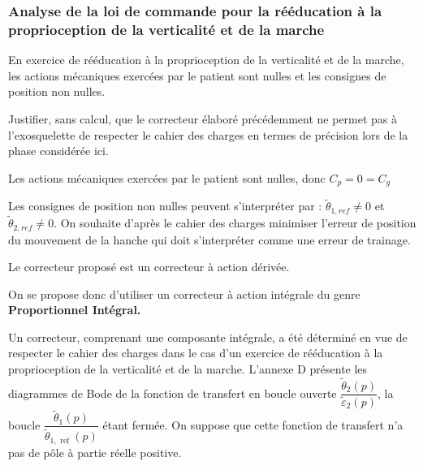 \subsubsection{Analyse de la loi de commande pour la rééducation à la proprioception de la verticalité et de la marche}

En exercice de rééducation à la proprioception de la verticalité et de la marche, les actions mécaniques exercées par le patient sont nulles et les consignes de position non nulles.\\

\begin{question}
\label{2023_ccs_psi_q_30}
Justifier, sans calcul, que le correcteur élaboré précédemment ne permet pas à l'exosquelette de respecter le cahier des charges en termes de précision lors de la phase considérée ici.
\end{question}
\ifprof
\begin{corrige}
Les actions mécaniques exercées par le patient sont nulles, donc $C_p=0=C_g$

Les consignes de position non nulles peuvent s'interpréter par : $\tilde{\theta}_{1,ref}\neq 0$ et $\tilde{\theta}_{2,ref}\neq 0$.
On souhaite d'après le cahier des charges minimiser l'erreur de position du mouvement de la hanche qui doit s'interpréter comme une erreur de trainage.

Le correcteur proposé est un correcteur à action dérivée.

On se propose donc d'utiliser un correcteur à action intégrale du genre \textbf{Proportionnel Intégral.}

\end{corrige}
\else
\fi

\ifprof
\else
Un correcteur, comprenant une composante intégrale, a été déterminé en vue de respecter le cahier des charges dans le cas d'un exercice de rééducation à la proprioception de la verticalité et de la marche. L'annexe D présente les diagrammes de Bode de la fonction de transfert en boucle ouverte $\dfrac{\tilde{\theta}_{2}(p)}{\tilde{\varepsilon}_{2}(p)}$, la boucle $\dfrac{\tilde{\theta}_{1}(p)}{\tilde{\theta}_{1, \text { ref }}(p)}$ étant fermée. On suppose que cette fonction de transfert n'a pas de pôle à partie réelle positive.\\


